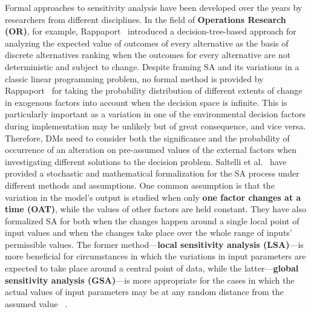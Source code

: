 \documentclass{sfuthesis}
\begin{document}
Formal approaches to sensitivity analysis have been developed over the years by researchers from different disciplines. In the field of \textbf{Operations Research (OR)}, for example, Rappaport~\cite{rappaport1967sensitivity} introduced a decision-tree-based approach for analyzing the expected value of outcomes of every alternative as the basis of discrete alternatives ranking when the outcomes for every alternative are not deterministic and subject to change. Despite framing SA and its variations in a classic linear programming problem, no formal method is provided by Rappaport~\cite{rappaport1967sensitivity} for taking the probability distribution of different extents of change in exogenous factors into account when the decision space is infinite. This is particularly important as a variation in one of the environmental decision factors during implementation may be unlikely but of great consequence, and vice versa. Therefore, DMs need to consider both the significance and the probability of occurrence of an alteration on pre-assumed values of the external factors when investigating different solutions to the decision problem. Saltelli et al.~\cite{saltelli2000sensitivity} have provided a stochastic and mathematical formalization for the SA process under different methods and assumptions. One common assumption is that the variation in the model’s output is studied when only \textbf{one factor changes at a time (OAT)}, while the values of other factors are held constant. They have also formalized SA for both when the changes happen around a single local point of input values and when the changes take place over the whole range of inputs’ permissible values. The former method—\textbf{local sensitivity analysis (LSA)}—is more beneficial for circumstances in which the variations in input parameters are expected to take place around a central point of data, while the latter—\textbf{global sensitivity analysis (GSA)}—is more appropriate for the cases in which the actual values of input parameters may be at any random distance from the assumed value ~\cite{saltelli2000sensitivity,saltelli2008global}.\par
\end{document}

